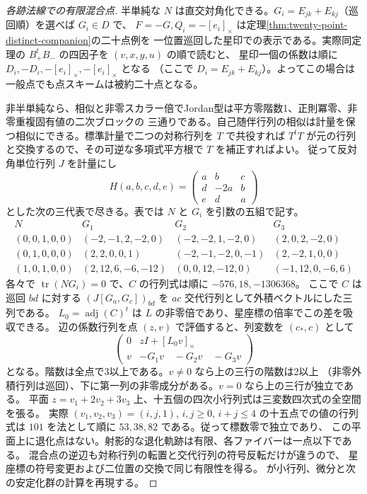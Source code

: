 \begin{proof}[各跡法線での有限混合点]
半単純な $N$ は直交対角化できる。$G_i=E_{jk}+E_{kj}$（巡回順）を選べば $G_i\in D$ で、
$F=-G,Q_i=-[e_i]_\times$ は定理\ref{thm:twenty-point-distinct-companion}の二十点例を
一位置巡回した星印での表示である。実際同定理の $B_+^t B_-$ の四因子を $(v,x,y,u)$ の順で読むと、
星印一個の係数は順に $D_i,-D_i,-[e_i]_\times,-[e_i]_\times$ となる
（ここで $D_i=E_{jk}+E_{kj}$）。よってこの場合は一般点でも点スキームは被約二十点となる。

非半単純なら、相似と非零スカラー倍でJordan型は平方零階数1、正則冪零、非零重複固有値の二次ブロックの
三通りである。自己随伴行列の相似は計量を保つ相似にできる。標準計量で二つの対称行列を
$T$ で共役すれば $T^tT$ が元の行列と交換するので、その可逆な多項式平方根で $T$ を補正すればよい。
従って反対角単位行列 $J$ を計量にし
\[
 H(a,b,c,d,e)=\begin{pmatrix}a&b&c\\d&-2a&b\\e&d&a\end{pmatrix}
\]
とした次の三代表で尽きる。表では $N$ と $G_i$ を引数の五組で記す。
\[
\begin{array}{c|c|c|c}
N&G_1&G_2&G_3\\ \hline
(0,0,1,0,0)&(-2,-1,2,-2,0)&(-2,-2,1,-2,0)&(2,0,2,-2,0)\\
(0,1,0,0,0)&(2,2,0,0,1)&(-2,-1,-2,0,-1)&(2,-2,1,0,0)\\
(1,0,1,0,0)&(2,12,6,-6,-12)&(0,0,12,-12,0)&(-1,12,0,-6,6)
\end{array}
\]
各々で $\operatorname{tr}(NG_i)=0$ で、$C$ の行列式は順に $-576,18,-1306368$。
ここで $C$ は巡回 $bd$ に対する $(J[G_a,G_c])_{bd}$ を $ac$ 交代行列として外積ベクトルにした三列である。
$L_0=\operatorname{adj}(C)^t$ は $L$ の非零倍であり、星座標の倍率でこの差を吸収できる。
辺の係数行列を点 $(z,v)$ で評価すると、列変数を $(c_*,c)$ として
\[
          \begin{pmatrix}0&zI+[L_0v]_\times\\v&-G_1v\quad -G_2v\quad -G_3v\end{pmatrix}
\]
となる。階数は全点で3以上である。$v\ne0$ なら上の三行の階数は2以上
（非零外積行列は巡回）、下に第一列の非零成分がある。$v=0$ なら上の三行が独立である。
平面 $z=v_1+2v_2+3v_3$ 上、十五個の四次小行列式は三変数四次式の全空間を張る。
実際 $(v_1,v_2,v_3)=(i,j,1)$, $i,j\ge0$, $i+j\le4$ の十五点での値の行列式は
$101$ を法として順に $53,38,82$ である。従って標数零で独立であり、
この平面上に退化点はない。射影的な退化軌跡は有限、各ファイバーは一点以下である。
混合点の逆辺も対称行列の転置と交代行列の符号反転だけが違うので、
星座標の符号変更および二位置の交換で同じ有限性を得る。
 が小行列、微分と次の安定化群の計算を再現する。
\end{proof}

